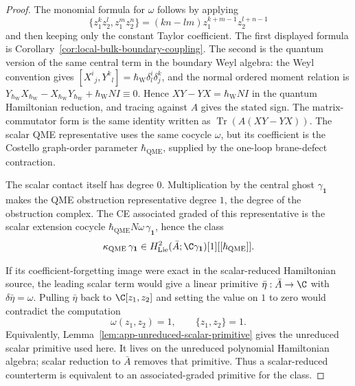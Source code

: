 \begin{proof}
  The monomial formula for \(\omega\) follows by applying
  \[
    \{z_1^kz_2^l,z_1^mz_2^n\}
      =(kn-lm)z_1^{k+m-1}z_2^{l+n-1}
  \]
  and then keeping only the constant Taylor coefficient.
  The first displayed formula is
  Corollary~\ref{cor:local-bulk-boundary-coupling}. The second is the
  quantum version of the same central term in the boundary Weyl algebra:
  the Weyl convention gives
  \([X^i{}_j,Y^k{}_l]=\hbar_{\mathrm{W}}\delta^i_l\delta^k_j\), and the normal
  ordered moment relation is
  \(Y_{\hbar_{\mathrm{W}}}X_{\hbar_{\mathrm{W}}}
    -X_{\hbar_{\mathrm{W}}}Y_{\hbar_{\mathrm{W}}}
    +\hbar_{\mathrm{W}}N I\equiv0\). Hence
  \(XY-YX=\hbar_{\mathrm{W}}N I\) in the quantum Hamiltonian reduction, and tracing
  against \(A\) gives the stated sign.  The matrix-commutator form is
  the same identity written as
  \(\operatorname{Tr}(A(XY-YX))\).
  The scalar QME representative uses the same cocycle \(\omega\), but
  its coefficient is the Costello graph-order parameter
  \(\hbar_{\mathrm{QME}}\), supplied by the one-loop brane-defect
  contraction.

  The scalar contact itself has degree \(0\). Multiplication by the
  central ghost \(\gamma_{\mathbf 1}\) makes the QME obstruction
  representative degree \(1\), the degree of the obstruction complex.
  The CE associated graded of this representative is the scalar
  extension cocycle
  \(\hbar_{\mathrm{QME}}N\omega\,\gamma_{\mathbf 1}\), hence the
  class
  \[
    \kappa_{\mathrm{QME}}\,\gamma_{\mathbf 1}
    \in H^2_{\mathrm{Lie}}(\bar A;\C\gamma_{\mathbf 1})[1]
      [[\hbar_{\mathrm{QME}}]].
  \]

  If its coefficient-forgetting image were exact in the scalar-reduced
  Hamiltonian source, the leading scalar term would give a linear primitive
  \(\bar\eta:\bar A\to\C\) with
  \(\delta\bar\eta=\omega\). Pulling \(\bar\eta\) back to
  \(\C[z_1,z_2]\) and setting the value on \(1\) to zero would contradict
  the computation
  \[
    \omega(z_1,z_2)=1,\qquad \{z_1,z_2\}=1 .
  \]
  Equivalently, Lemma~\ref{lem:app-unreduced-scalar-primitive} gives
  the unreduced scalar primitive used here.  It lives on the unreduced
  polynomial Hamiltonian algebra; scalar reduction to \(\bar A\) removes
  that primitive.  Thus a scalar-reduced counterterm is equivalent to an
  associated-graded primitive for the class.
\end{proof}

